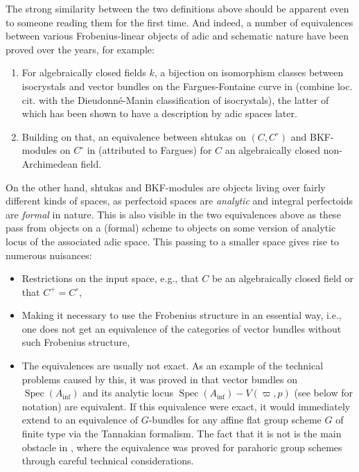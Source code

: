 \documentclass[10pt,twoside]{article}
\numberwithin{equation}{section}
\theoremstyle{plain}
\theoremstyle{definition}
\DeclareMathOperator{\Spec}{Spec}
\DeclareMathOperator{\Inf}{inf}
\newcommand{\Ainf}{A_{\Inf}}
\begin{document}
The strong similarity between the two definitions above should be apparent even to someone reading them for the first time. And indeed, a number of equivalences between various Frobenius-linear objects of adic and schematic nature have been proved over the years, for example:
\begin{enumerate}
   \item For algebraically closed fields \(k\), a bijection on isomorphism classes between isocrystals and vector bundles on the Fargues-Fontaine curve in \cite[Théorème 8.2.10 (4)]{FF18} (combine loc. cit. with the Dieudonné-Manin classification of isocrystals), the latter of which has been shown to have a description by adic spaces later.
   \item Building on that, an equivalence between shtukas on \((C,C^\circ)\) and BKF-modules on \(C^{\circ}\) in \cite[Theorem 14.1.1, 1. and 5.]{SW20} (attributed to Fargues) for \(C\) an algebraically closed non-Archimedean field.
\end{enumerate}
On the other hand, shtukas and BKF-modules are objects living over fairly different kinds of spaces, as perfectoid spaces are \emph{analytic} and integral perfectoids are \emph{formal} in nature. This is also visible in the two equivalences above as these pass from objects on a (formal) scheme to objects on some version of analytic locus of the associated adic space. This passing to a smaller space gives rise to numerous nuisances:
\begin{itemize}
\item Restrictions on the input space, e.g., that \(C\) be an algebraically closed field or that \(C^+=C^\circ\),
\item Making it necessary to use the Frobenius structure in an essential way, i.e., one does not get an equivalence of the categories of vector bundles without such Frobenius structure,
\item The equivalences are usually not exact. As an example of the technical problems caused by this, it was proved in \cite{Ked19} that vector bundles on \(\Spec(\Ainf)\) and its analytic locus \(\Spec(\Ainf)-V(\varpi, p)\) (see below for notation) are equivalent. If this equivalence were exact, it would immediately extend to an equivalence of \(G\)-bundles for any affine flat group scheme \(G\) of finite type via the Tannakian formalism. The fact that it is not is the main obstacle in \cite{Ans18}, where the equivalence was proved for parahoric group schemes through careful technical considerations.
\end{itemize}
\end{document}
